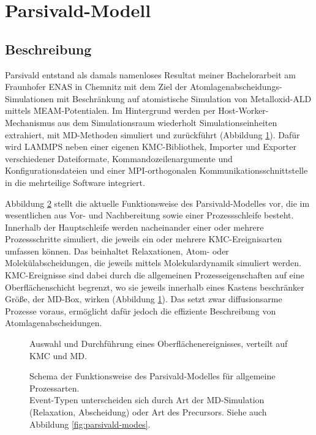 \section{Parsivald-Modell}
\label{sec:parsivald}

\subsection{Beschreibung}

Parsivald entstand als damals namenloses Resultat meiner Bachelorarbeit\cite{lorenz_entwicklung_2012} am Fraunhofer ENAS in Chemnitz mit dem Ziel der Atom\-lagen\-abscheidungs-Simulationen mit Beschränkung auf atomistische Simulation von Metall\-oxid-ALD mittels MEAM-Potentialen.
Im Hintergrund werden per Host-Worker-Mechanismus aus dem Simulationsraum wiederholt Simulationseinheiten extrahiert, mit MD-Methoden simuliert und zurückführt (Abbildung \ref{fig:parsivald-schema}).
Dafür wird LAMMPS neben einer eigenen KMC-Bibliothek, Importer und Exporter verschiedener Dateiformate, Kommandozeilenargumente und Konfigurationsdateien und einer MPI-orthogonalen Kommunikationsschnittstelle in die mehrteilige Software integriert.

Abbildung \ref{fig:parsivald-stephierarchy} stellt die aktuelle Funktionsweise des Parsivald-Modelles vor, die im wesentlichen aus Vor- und Nachbereitung sowie einer Prozessschleife besteht.
Innerhalb der Hauptschleife werden nacheinander einer oder mehrere Prozessschritte simuliert, die jeweils ein oder mehrere KMC-Ereignisarten umfassen können.
Das beinhaltet Relaxationen, Atom- oder Molekülabscheidungen, die jeweils mittels Molekulardynamik simuliert werden.
KMC-Ereignisse sind dabei durch die allgemeinen Prozesseigenschaften auf eine Oberflächenschicht begrenzt, wo sie jeweils innerhalb eines Kastens beschränker Größe, der MD-Box, wirken (Abbildung \ref{fig:parsivald-schema}).
Das setzt zwar diffusionsarme Prozesse voraus, ermöglicht dafür jedoch die effiziente Beschreibung von Atomlagenabscheidungen.

\begin{figure}
  \centering
  \def\svgwidth{\textwidth}
  
  \caption[Parsivald-Schema]{
    Auswahl und Durchführung eines Oberflächenereignisses, verteilt auf KMC und MD.
  }
  \label{fig:parsivald-schema}
\end{figure}

\begin{figure}
  \centering
  \def\svgwidth{\textwidth}
  
  \caption[Parsivald-Funktionsweise asd]{
    Schema der Funktionsweise des Parsivald-Modelles für allgemeine Prozessarten.
    \\
    Event-Typen unterscheiden sich durch Art der MD-Simulation (Relaxation, Abscheidung) oder Art des Precursors.
    Siehe auch Abbildung \ref{fig:parsivald-modes}.
  }
  \label{fig:parsivald-stephierarchy}
\end{figure}

